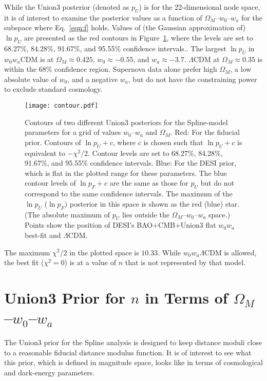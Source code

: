 \documentclass{aastex631}
\begin{document}
While the Union3 posterior (denoted as $p_U$) is for the 22-dimensional node space, it is of interest to examine the posterior values 
as a function of $\Omega_M$--$w_0$--$w_a$ for the
subspace where Eq.~\ref{eqn:f} holds. 
Values of (the Gaussian approximation of) $\ln{p_U}$
 are presented as the red contours in Figure~\ref{fig:posterior}, where the levels are set to 68.27\%, 84.28\%, 91.67\%, and 95.55\% confidence intervals..
The largest $\ln{p_U}$ in $w_0w_a$CDM is at $\Omega_M\approx 0.425$, $w_0 \approx -0.55$, and $w_a \approx -3.7$. $\Lambda$CDM at $\Omega_M \approx 0.35$ is within the 68\% confidence region.
Supernova data alone prefer high $\Omega_M$, a low absolute value of $w_0$, and a negative $w_a$, but do not have
the constraining power to exclude standard cosmology.

\begin{figure}[htbp] %
   \centering
   \texttt{[image: contour.pdf]} 
   \caption{Contours of two different Union3 posteriors for the Spline-model parameters for a grid of values
 $w_0$--$w_a$ and $\Omega_M$.   
  Red: For the fiducial prior.  Contours of  $\ln{p_U}+c$, where $c$ is chosen such that $\ln{p_U}+c$  is equivalent to  $-\chi^2/2$. Contour levels are set to 68.27\%, 84.28\%, 91.67\%, and 95.55\% confidence intervals.
   Blue: For the DESI prior, which is flat in the plotted range for these parameters. 
   The blue contour levels of $\ln{p_F}+c$ are the same as those for $p_U$ but do not correspond to the same confidence intervals.
   The maximum of the $\ln{p}_U$  ($\ln{p}_F)$ posterior in this space is shown as the red (blue) star.  (The absolute maximum
   of $p_U$
   lies outside the $\Omega_M$--$w_0$--$w_a$ space.)
   Points show the position of DESI's  BAO+CMB+Union3 flat $w_0w_a$ best-fit 
    and  $\Lambda$CDM.}
   \label{fig:posterior}
\end{figure}

The maximum $\chi^2/2$ in the plotted space is $10.33$.  While $w_0w_a\Lambda$CDM is allowed, the best fit ($\chi^2=0$)
is at a value of $n$ that is not represented by that model. 

\section{Union3 Prior for $n$ in Terms of $\Omega_M$--$w_0$--$w_a$}
\label{sec:prior}
The Union3 prior for the Spline analysis is designed to keep distance moduli close to a reasonable
fiducial distance modulus function.  It is of interest to see what this prior, which is defined in magnitude
space, looks like in terms of cosmological and dark-energy parameters.
\end{document}
